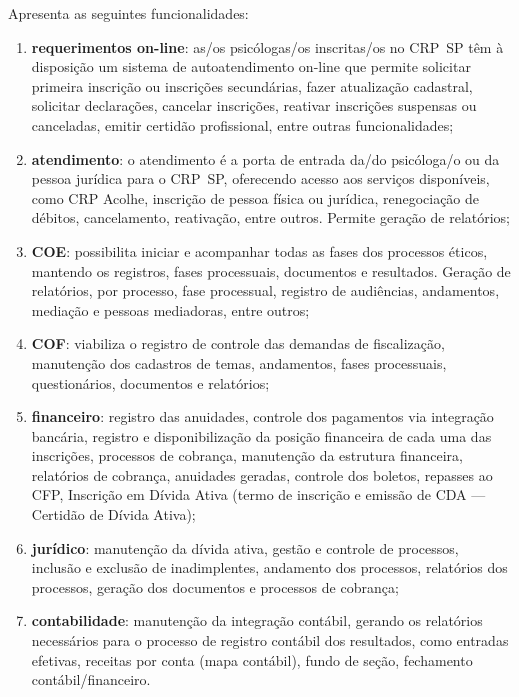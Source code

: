 \documentclass[openright, twoside, a4paper]{memoir}
\begin{document}
Apresenta as seguintes funcionalidades:

\begin{enumerate}

\item
    \textbf{requerimentos on-line}: as/os psicólogas/os inscritas/os no
    CRP~SP têm à disposição um sistema de autoatendimento on-line que
    permite solicitar primeira inscrição ou inscrições secundárias, fazer
    atualização cadastral, solicitar declarações, cancelar inscrições,
    reativar inscrições suspensas ou canceladas, emitir certidão
    profissional, entre outras funcionalidades;
\item
    \textbf{atendimento}: o atendimento é a porta de entrada da/do
    psicóloga/o ou da pessoa jurídica para o CRP~SP, oferecendo acesso aos
    serviços disponíveis, como CRP Acolhe, inscrição de pessoa física ou
    jurídica, renegociação de débitos, cancelamento, reativação, entre
    outros. Permite geração de relatórios;
\item
    \textbf{COE}: possibilita iniciar e acompanhar todas as fases dos
    processos éticos, mantendo os registros, fases processuais, documentos
    e resultados. Geração de relatórios, por processo, fase processual,
    registro de audiências, andamentos, mediação e pessoas mediadoras,
    entre outros;
\item
    \textbf{COF}: viabiliza o registro de controle das demandas de
    fiscalização, manutenção dos cadastros de temas, andamentos, fases
    processuais, questionários, documentos e relatórios;
\item
    \textbf{financeiro}: registro das anuidades, controle dos pagamentos
    via integração bancária, registro e disponibilização da posição
    financeira de cada uma das inscrições, processos de cobrança,
    manutenção da estrutura financeira, relatórios de cobrança, anuidades
    geradas, controle dos boletos, repasses ao CFP, Inscrição em Dívida
    Ativa (termo de inscrição e emissão de CDA --- Certidão de Dívida
    Ativa);
\item
    \textbf{jurídico}: manutenção da dívida ativa, gestão e controle de
    processos, inclusão e exclusão de inadimplentes, andamento dos
    processos, relatórios dos processos, geração dos documentos e
    processos de cobrança;
\item
    \textbf{contabilidade}: manutenção da integração contábil, gerando os
    relatórios necessários para o processo de registro contábil dos
    resultados, como entradas efetivas, receitas por conta (mapa
    contábil), fundo de seção, fechamento contábil/financeiro.
\end{enumerate}
\end{document}
